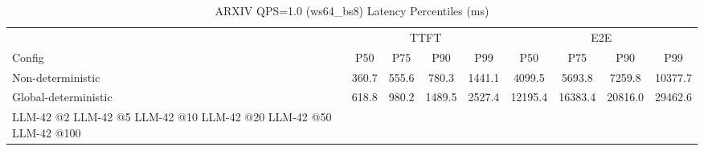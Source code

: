 \begin{table}[htbp]
\centering
\caption{ARXIV QPS=1.0 (ws64_bs8) Latency Percentiles (ms)}
\label{tab:arxiv_qps1.0_ws64_bs8}
\begin{tabular}{l|cccc|cccc}
\toprule
& \multicolumn{4}{c|}{TTFT} & \multicolumn{4}{c}{E2E} \\
Config & P50 & P75 & P90 & P99 & P50 & P75 & P90 & P99 \\
\midrule
Non-deterministic & 360.7 & 555.6 & 780.3 & 1441.1 & 4099.5 & 5693.8 & 7259.8 & 10377.7 \\
Global-deterministic & 618.8 & 980.2 & 1489.5 & 2527.4 & 12195.4 & 16383.4 & 20816.0 & 29462.6 \\
LLM-42 @2%
LLM-42 @5%
LLM-42 @10%
LLM-42 @20%
LLM-42 @50%
LLM-42 @100%
\bottomrule
\end{tabular}
\end{table}
